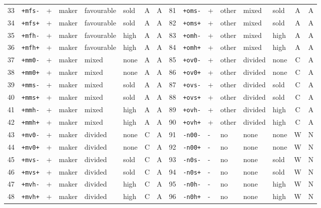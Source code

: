 {\begin{longtable}{@{}rlllllcc@{\hspace{2.2em}}rlllllcc@{}}
33 & \texttt{+mfs-} & + & maker & favourable & sold & A & A & 81 & \texttt{+oms-} & + & other & mixed & sold & A & A \\
34 & \texttt{+mfs+} & + & maker & favourable & sold & A & A & 82 & \texttt{+oms+} & + & other & mixed & sold & A & A \\
35 & \texttt{+mfh-} & + & maker & favourable & high & A & A & 83 & \texttt{+omh-} & + & other & mixed & high & A & A \\
36 & \texttt{+mfh+} & + & maker & favourable & high & A & A & 84 & \texttt{+omh+} & + & other & mixed & high & A & A \\
37 & \texttt{+mm0-} & + & maker & mixed & none & A & A & 85 & \texttt{+ov0-} & + & other & divided & none & C & A \\
38 & \texttt{+mm0+} & + & maker & mixed & none & A & A & 86 & \texttt{+ov0+} & + & other & divided & none & C & A \\
39 & \texttt{+mms-} & + & maker & mixed & sold & A & A & 87 & \texttt{+ovs-} & + & other & divided & sold & C & A \\
40 & \texttt{+mms+} & + & maker & mixed & sold & A & A & 88 & \texttt{+ovs+} & + & other & divided & sold & C & A \\
41 & \texttt{+mmh-} & + & maker & mixed & high & A & A & 89 & \texttt{+ovh-} & + & other & divided & high & C & A \\
42 & \texttt{+mmh+} & + & maker & mixed & high & A & A & 90 & \texttt{+ovh+} & + & other & divided & high & C & A \\
43 & \texttt{+mv0-} & + & maker & divided & none & C & A & 91 & \texttt{-n00-} & - & no & none & none & W & N \\
44 & \texttt{+mv0+} & + & maker & divided & none & C & A & 92 & \texttt{-n00+} & - & no & none & none & W & N \\
45 & \texttt{+mvs-} & + & maker & divided & sold & C & A & 93 & \texttt{-n0s-} & - & no & none & sold & W & N \\
46 & \texttt{+mvs+} & + & maker & divided & sold & C & A & 94 & \texttt{-n0s+} & - & no & none & sold & W & N \\
47 & \texttt{+mvh-} & + & maker & divided & high & C & A & 95 & \texttt{-n0h-} & - & no & none & high & W & N \\
48 & \texttt{+mvh+} & + & maker & divided & high & C & A & 96 & \texttt{-n0h+} & - & no & none & high & W & N \\
\end{longtable}}
